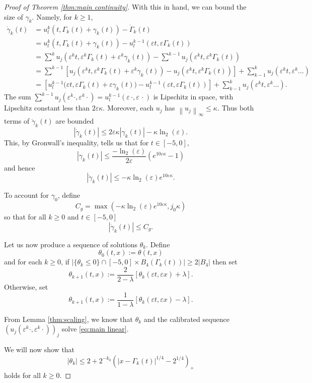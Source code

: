 \documentclass[11pt]{amsart}
\theoremstyle{remark}
\theoremstyle{definition}
\newcommand{\eps}{\varepsilon}
\newcommand{\norm}[1]{\left\lVert#1\right\rVert}
\newcommand{\paren}[1]{\left( #1 \right)}
\newcommand{\bracket}[1]{\left[ #1 \right]}
\newcommand{\ulow}{u_l}
\newcommand{\ulowth}[1]{\ulow^{#1}}
\newcommand{\Cgamma}{C_g}
\begin{document}
\begin{proof}[Proof of Theorem \ref{thm:main continuity}]
With this in hand, we can bound the size of $\gamma_k$.  Namely, for $k \geq 1$, 
\begin{align*}
\dot{\gamma}_k(t) &= \ulowth{k}(t, \Gamma_k(t) + \gamma_k(t)) - \dot{\Gamma}_k(t)
\\ &= \ulowth{k}(t, \Gamma_k(t) + \gamma_k(t)) - \ulowth{k-1}(\eps t, \eps \Gamma_k(t))
\\ &= \sum^k u_j(\eps^k t, \eps^k \Gamma_k(t) + \eps^k \gamma_k(t)) - \sum^{k-1} u_j(\eps^k t, \eps^k \Gamma_k(t))
\\ &= \sum^{k-1} \bracket{u_j(\eps^k t, \eps^k \Gamma_k(t)+\eps^k \gamma_k(t)) - u_j(\eps^k t, \eps^k \Gamma_k(t))} + \sum_{k-1}^k u_j(\eps^k t, \eps^k \ldots)
\\ &= \bracket{\ulowth{k-1}\big(\eps t, \eps \Gamma_k(t)+\eps \gamma_k(t)\big) - \ulowth{k-1}(\eps t, \eps \Gamma_k(t))} + \sum_{k-1}^k u_j(\eps^k t, \eps^k \ldots).
\end{align*}
The sum $\sum^{k-1} u_j(\eps^k \cdot, \eps^k \cdot) = \ulowth{k-1}(\eps \, \cdot, \eps \, \cdot)$ is Lipschitz in space, with Lipschitz constant less than $2 \eps \kappa$.  Moreover, each $u_j$ has $\norm{u_j}_\infty \leq \kappa$.  Thus both terms of $\dot{\gamma}_k(t)$ are bounded
\[ |\dot{\gamma}_k(t)| \leq 2 \eps \kappa |\gamma_k(t)| - \kappa \ln_2(\eps). \]
This, by Gronwall's inequality, tells us that for $t \in [-5,0]$,
\[ |\gamma_k(t)| \leq \frac{-\ln_2(\eps)}{2 \eps} \paren{ e^{10 \eps \kappa} - 1} \]
and hence
\[ |\dot{\gamma}_k(t)| \leq -\kappa \ln_2(\eps) e^{10\eps \kappa}. \]

To account for $\gamma_0$, define
\[ \Cgamma = \max\paren{ - \kappa \ln_2(\eps) e^{10\eps\kappa}, j_0 \kappa} \]
so that for all $k \geq 0$ and $t \in [-5,0]$
\[ |\dot{\gamma}_k(t)| \leq \Cgamma. \]

Let us now produce a sequence of solutions $\theta_k$.  Define
\[ \theta_0(t,x) := \theta(t,x) \]
and for each $k \geq 0$, if $|\{\theta_k \leq 0\} \cap [-5,0]\times B_4(\Gamma_k(t))| \geq 2|B_4|$ then set
\[ \theta_{k+1}(t,x) := \frac{2}{2-\lambda} \bracket{\theta_k(\eps t, \eps x) + \lambda}. \]
Otherwise, set
\[ \theta_{k+1}(t,x) := \frac{1}{1-\lambda} \bracket{\theta_k(\eps t, \eps x) - \lambda}. \]

From Lemma \ref{thm:scaling}, we know that $\theta_k$ and the calibrated sequence $(u_j(\eps^k \cdot, \eps^k \cdot))_j$ solve \eqref{eq:main linear}.  

We will now show that
\begin{equation}\label{thetak below the barrier}
|\theta_k| \leq 2 + 2^{-k_0} \paren{|x-\Gamma_k(t)|^{1/4} - 2^{1/4}}_+
\end{equation}
holds for all $k \geq 0$.  


\end{proof}
\end{document}
